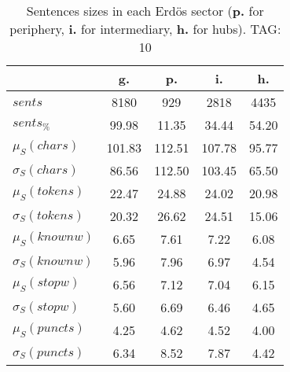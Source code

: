 \begin{table}[h!]
\begin{center}
\begin{tabular}{| l | c | c | c | c |}\hline
 & g. & p. & i. & h. \\\hline
$sents$ & 8180  & 929  & 2818  & 4435 \\\hline
$sents_{\%}$ & 99.98  & 11.35  & 34.44  & 54.20 \\\hline
$\mu_S(chars)$ & 101.83  & 112.51  & 107.78  & 95.77 \\\hline
$\sigma_S(chars)$ & 86.56  & 112.50  & 103.45  & 65.50 \\\hline
$\mu_S(tokens)$ & 22.47  & 24.88  & 24.02  & 20.98 \\\hline
$\sigma_S(tokens)$ & 20.32  & 26.62  & 24.51  & 15.06 \\\hline
$\mu_S(knownw)$ & 6.65  & 7.61  & 7.22  & 6.08 \\\hline
$\sigma_S(knownw)$ & 5.96  & 7.96  & 6.97  & 4.54 \\\hline
$\mu_S(stopw)$ & 6.56  & 7.12  & 7.04  & 6.15 \\\hline
$\sigma_S(stopw)$ & 5.60  & 6.69  & 6.46  & 4.65 \\\hline
$\mu_S(puncts)$ & 4.25  & 4.62  & 4.52  & 4.00 \\\hline
$\sigma_S(puncts)$ & 6.34  & 8.52  & 7.87  & 4.42 \\\hline
\end{tabular}
\caption{Sentences sizes in each Erd\"os sector ({{\bf p.}} for periphery, {{\bf i.}} for intermediary, {{\bf h.}} for hubs). TAG: 10}
\end{center}
\end{table}